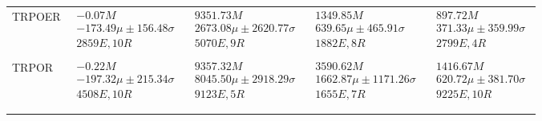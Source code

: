 \begin{tabular}{|l|p{3.2cm}|p{3.2cm}|p{3.2cm}|p{3.2cm}|}
TRPOER & $\begin{array}{c} -0.07M \\ -173.49\mu \pm 156.48\sigma \\ 2859E, 10R \end{array}$ & $\begin{array}{c} 9351.73M \\ 2673.08\mu \pm 2620.77\sigma \\ 5070E, 9R \end{array}$ & $\begin{array}{c} 1349.85M \\ 639.65\mu \pm 465.91\sigma \\ 1882E, 8R \end{array}$ & $\begin{array}{c} 897.72M \\ 371.33\mu \pm 359.99\sigma \\ 2799E, 4R \end{array}$ \\ \\ \hline
TRPOR & $\begin{array}{c} -0.22M \\ -197.32\mu \pm 215.34\sigma \\ 4508E, 10R \end{array}$ & $\begin{array}{c} 9357.32M \\ 8045.50\mu \pm 2918.29\sigma \\ 9123E, 5R \end{array}$ & $\begin{array}{c} 3590.62M \\ 1662.87\mu \pm 1171.26\sigma \\ 1655E, 7R \end{array}$ & $\begin{array}{c} 1416.67M \\ 620.72\mu \pm 381.70\sigma \\ 9225E, 10R \end{array}$ \\ \\ \hline
\bottomrule \\ \hline
\end{tabular}
